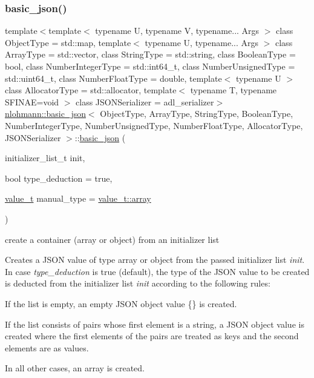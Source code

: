 \subsubsection{\texorpdfstring{basic\+\_\+json()}{basic\_json()}\hspace{0.1cm}{\footnotesize\ttfamily [4/8]}}
{\footnotesize\ttfamily template$<$template$<$ typename U, typename V, typename... Args $>$ class Object\+Type = std\+::map, template$<$ typename U, typename... Args $>$ class Array\+Type = std\+::vector, class String\+Type  = std\+::string, class Boolean\+Type  = bool, class Number\+Integer\+Type  = std\+::int64\+\_\+t, class Number\+Unsigned\+Type  = std\+::uint64\+\_\+t, class Number\+Float\+Type  = double, template$<$ typename U $>$ class Allocator\+Type = std\+::allocator, template$<$ typename T, typename S\+F\+I\+N\+A\+E=void $>$ class J\+S\+O\+N\+Serializer = adl\+\_\+serializer$>$ \\
\mbox{\hyperlink{classnlohmann_1_1basic__json}{nlohmann\+::basic\+\_\+json}}$<$ Object\+Type, Array\+Type, String\+Type, Boolean\+Type, Number\+Integer\+Type, Number\+Unsigned\+Type, Number\+Float\+Type, Allocator\+Type, J\+S\+O\+N\+Serializer $>$\+::\mbox{\hyperlink{classnlohmann_1_1basic__json}{basic\+\_\+json}} (\begin{DoxyParamCaption}\item[{initializer\+\_\+list\+\_\+t}]{init,  }\item[{bool}]{type\+\_\+deduction = {\ttfamily true},  }\item[{\mbox{\hyperlink{namespacenlohmann_1_1detail_a90aa5ef615aa8305e9ea20d8a947980f}{value\+\_\+t}}}]{manual\+\_\+type = {\ttfamily \mbox{\hyperlink{namespacenlohmann_1_1detail_a90aa5ef615aa8305e9ea20d8a947980faf1f713c9e000f5d3f280adbd124df4f5}{value\+\_\+t\+::array}}} }\end{DoxyParamCaption})\hspace{0.3cm}{\ttfamily [inline]}}



create a container (array or object) from an initializer list 

Creates a J\+S\+ON value of type array or object from the passed initializer list {\itshape init}. In case {\itshape type\+\_\+deduction} is {\ttfamily true} (default), the type of the J\+S\+ON value to be created is deducted from the initializer list {\itshape init} according to the following rules\+:


\begin{DoxyEnumerate}
\item If the list is empty, an empty J\+S\+ON object value {\ttfamily \{\}} is created.
\item If the list consists of pairs whose first element is a string, a J\+S\+ON object value is created where the first elements of the pairs are treated as keys and the second elements are as values.
\item In all other cases, an array is created.
\end{DoxyEnumerate}

